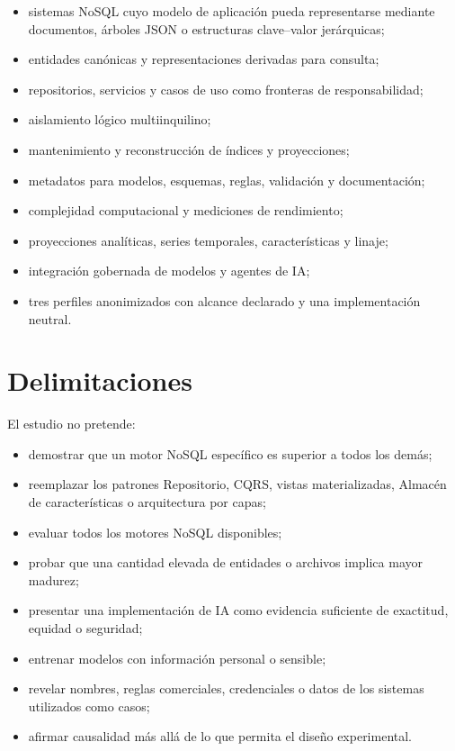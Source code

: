 \begin{itemize}[leftmargin=*]
  \item sistemas NoSQL cuyo modelo de aplicación pueda representarse mediante
  documentos, árboles JSON o estructuras clave--valor jerárquicas;
  \item entidades canónicas y representaciones derivadas para consulta;
  \item repositorios, servicios y casos de uso como fronteras de responsabilidad;
  \item aislamiento lógico multiinquilino;
  \item mantenimiento y reconstrucción de índices y proyecciones;
  \item metadatos para modelos, esquemas, reglas, validación y documentación;
  \item complejidad computacional y mediciones de rendimiento;
  \item proyecciones analíticas, series temporales, características y linaje;
  \item integración gobernada de modelos y agentes de IA;
  \item tres perfiles anonimizados con alcance declarado y una implementación neutral.
\end{itemize}

\section{Delimitaciones}

El estudio no pretende:

\begin{itemize}[leftmargin=*]
  \item demostrar que un motor NoSQL específico es superior a todos los demás;
  \item reemplazar los patrones Repositorio, CQRS, vistas materializadas, Almacén de características
  o arquitectura por capas;
  \item evaluar todos los motores NoSQL disponibles;
  \item probar que una cantidad elevada de entidades o archivos implica mayor madurez;
  \item presentar una implementación de IA como evidencia suficiente de exactitud,
  equidad o seguridad;
  \item entrenar modelos con información personal o sensible;
  \item revelar nombres, reglas comerciales, credenciales o datos de los sistemas
  utilizados como casos;
  \item afirmar causalidad más allá de lo que permita el diseño experimental.
\end{itemize}

